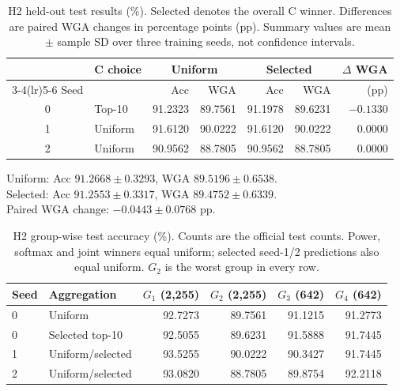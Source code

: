 \documentclass[runningheads]{llncs}
\begin{document}
\begin{table}[H]
\centering
\caption{H2 held-out test results (\%). Selected denotes the overall C winner. Differences are paired WGA changes in percentage points (pp). Summary values are mean $\pm$ sample SD over three training seeds, not confidence intervals.}
\label{tab:h2-results}
\small
\setlength{\tabcolsep}{4pt}
\begin{tabular}{@{}clrrrrr@{}}
\toprule
 & C choice & \multicolumn{2}{c}{Uniform} & \multicolumn{2}{c}{Selected} & $\Delta$ WGA \\
\cmidrule(lr){3-4}\cmidrule(lr){5-6}
Seed & & Acc & WGA & Acc & WGA & (pp) \\
\midrule
0 & Top-10 & 91.2323 & 89.7561 & 91.1978 & 89.6231 & $-0.1330$ \\
1 & Uniform & 91.6120 & 90.0222 & 91.6120 & 90.0222 & 0.0000 \\
2 & Uniform & 90.9562 & 88.7805 & 90.9562 & 88.7805 & 0.0000 \\
\bottomrule
\end{tabular}
\par\vspace{3pt}
{\footnotesize Uniform: Acc $91.2668\pm0.3293$, WGA $89.5196\pm0.6538$.\\
Selected: Acc $91.2553\pm0.3317$, WGA $89.4752\pm0.6339$.\\
Paired WGA change: $-0.0443\pm0.0768$ pp.}
\end{table}

\begin{table}[H]
\centering
\caption{H2 group-wise test accuracy (\%). Counts are the official test counts. Power, softmax and joint winners equal uniform; selected seed-1/2 predictions also equal uniform. $G_2$ is the worst group in every row.}
\label{tab:h2-groups}
\small
\begin{tabular}{@{}llrrrr@{}}
\toprule
Seed & Aggregation & $G_1$ (2,255) & $G_2$ (2,255) & $G_3$ (642) & $G_4$ (642) \\
\midrule
0 & Uniform & 92.7273 & 89.7561 & 91.1215 & 91.2773 \\
0 & Selected top-10 & 92.5055 & 89.6231 & 91.5888 & 91.7445 \\
1 & Uniform/selected & 93.5255 & 90.0222 & 90.3427 & 91.7445 \\
2 & Uniform/selected & 93.0820 & 88.7805 & 89.8754 & 92.2118 \\
\bottomrule
\end{tabular}
\end{table}
\end{document}
